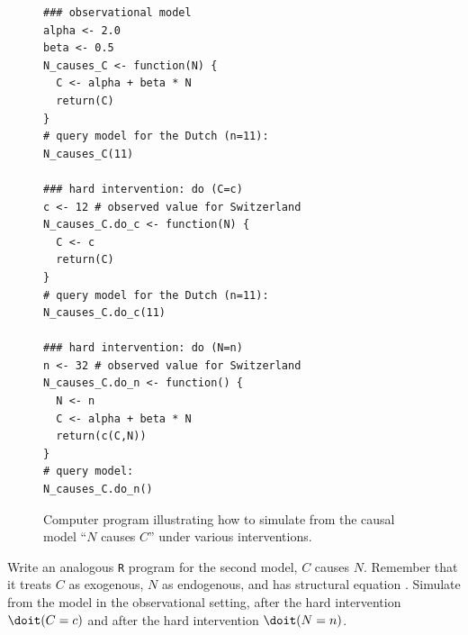 \begin{figure}\centering
\begin{lstlisting}
### observational model
alpha <- 2.0
beta <- 0.5
N_causes_C <- function(N) {
  C <- alpha + beta * N
  return(C)
}
# query model for the Dutch (n=11):
N_causes_C(11)

### hard intervention: do (C=c)
c <- 12 # observed value for Switzerland
N_causes_C.do_c <- function(N) {
  C <- c
  return(C)
}
# query model for the Dutch (n=11):
N_causes_C.do_c(11)

### hard intervention: do (N=n)
n <- 32 # observed value for Switzerland
N_causes_C.do_n <- function() {
  N <- n
  C <- alpha + beta * N
  return(c(C,N))
}
# query model:
N_causes_C.do_n()
\end{lstlisting}
\caption{Computer program illustrating how to simulate from the causal model ``$N$ causes $C$'' under various interventions.\label{fig:scm_N_causes_C}}
\end{figure}

\begin{Exc}
  Write an analogous \texttt{R} program for the second model, $C$ causes $N$. Remember that it
  treats $C$ as exogenous, $N$ as endogenous, and has structural equation .
  Simulate from the model in the observational setting, after the hard intervention
  $\doit(C=c)$ and after the hard intervention $\doit(N=n)$.
\end{Exc}

